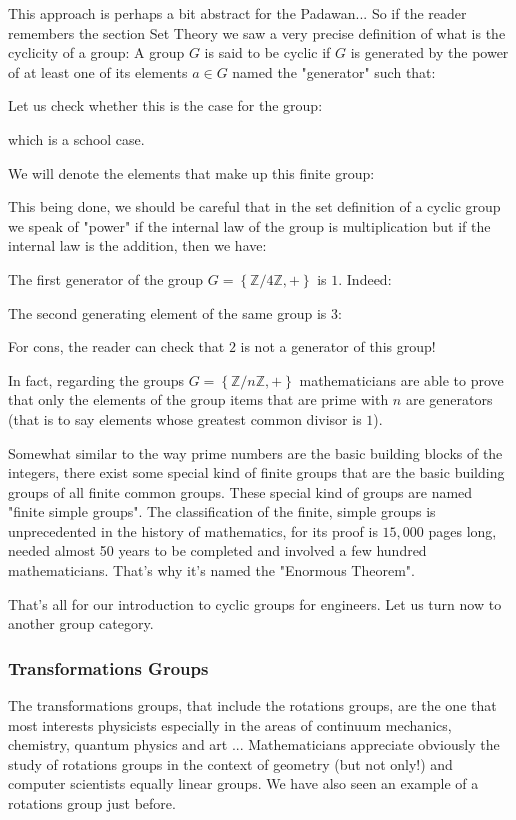 	This approach is perhaps a bit abstract for the Padawan... So if the reader remembers the section Set Theory we saw a very precise definition of what is the cyclicity of a group: A group $G$ is said to be cyclic if $G$ is generated by the power of at least one of its elements $a\in G$ named the "generator" such that:
	
	Let us check whether this is the case for the group:
	
	which is a school case.
	
	We will denote the elements that make up this finite group:
	
	This being done, we should be careful that in the set definition of a cyclic group we speak of "power" if the internal law of the group is multiplication but if the internal law is the addition, then we have:
	
	The first generator of the group $G=\left\lbrace \mathbb{Z}/4\mathbb{Z},+ \right\rbrace$ is $1$. Indeed:
	
	The second generating element of the same group is $3$:
	
	For cons, the reader can check that $2$ is not a generator of this group!
	
	In fact, regarding the groups $G=\left\lbrace \mathbb{Z}/n\mathbb{Z},+ \right\rbrace$ mathematicians are able to prove that only the elements of the group items that are prime with $n$ are generators (that is to say elements whose greatest common divisor is $1$).
	
	\begin{tcolorbox}[title=Remark,colframe=black,arc=10pt]
	Somewhat similar to the way prime numbers are the basic building blocks of the integers, there exist some special kind of finite groups that are the basic building groups of all finite common groups. These special kind of groups are named "finite simple groups". The classification of the finite, simple groups is unprecedented in the history of mathematics, for its proof is $15,000$ pages long, needed almost 50 years to be completed and involved a few hundred mathematicians. That's why it's named the "Enormous Theorem".
	\end{tcolorbox}
	
	That's all for our introduction to cyclic groups for engineers. Let us turn now to another group category.
	
	\subsubsection{Transformations Groups}
	The transformations groups, that include the rotations groups, are the one that most interests physicists especially in the areas of continuum mechanics, chemistry, quantum physics and art ... Mathematicians appreciate obviously the study of rotations groups in the context of geometry (but not only!) and computer scientists equally linear groups. We have also seen an example of a rotations group just before.
	

